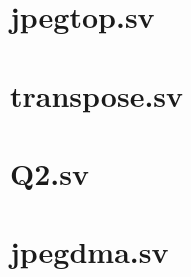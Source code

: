 \documentclass[a4paper]{article}
\begin{document}
\newpage
\begin{appendices}
\begin{changemargin}{-3cm}{-3cm} 
\section{jpegtop.sv}


\section{transpose.sv}


\section{Q2.sv}


\section{jpegdma.sv}

\end{changemargin}
\end{appendices}
\end{document}
